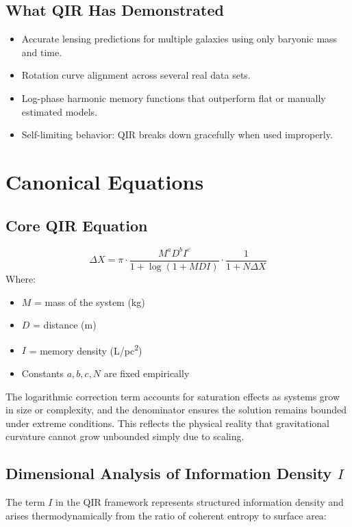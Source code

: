 \documentclass[11pt]{article}
\begin{document}
\subsection{What QIR Has Demonstrated}
\begin{itemize}
  \item Accurate lensing predictions for multiple galaxies using only baryonic mass and time.
  \item Rotation curve alignment across several real data sets.
  \item Log-phase harmonic memory functions that outperform flat or manually estimated models.
  \item Self-limiting behavior: QIR breaks down gracefully when used improperly.
\end{itemize}

\section{Canonical Equations}

\subsection{Core QIR Equation}
\[
\Delta X = \pi \cdot \frac{M^a D^b I^c}{1 + \log(1 + MDI)} \cdot \frac{1}{1 + N \Delta X}
\]
Where:
\begin{itemize}
  \item \(M\) = mass of the system (kg)
  \item \(D\) = distance (m)
  \item \(I\) = memory density (L/pc\textsuperscript{2})
  \item Constants \(a, b, c, N\) are fixed empirically
\end{itemize}

The logarithmic correction term accounts for saturation effects as systems grow in size or complexity, and the denominator ensures the solution remains bounded under extreme conditions. This reflects the physical reality that gravitational curvature cannot grow unbounded simply due to scaling.

\subsection{Dimensional Analysis of Information Density \( I \)}

The term \( I \) in the QIR framework represents structured information density and arises thermodynamically from the ratio of coherent entropy to surface area:
\end{document}
